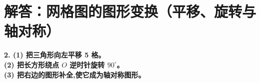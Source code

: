 

\section{解答：网格图的图形变换（平移、旋转与轴对称）}

\vspace{0.4cm}

\noindent\textbf{2. (1) 把三角形向左平移 5 格。}\\
\noindent\textbf{   (2) 把长方形绕点 $O$ 逆时针旋转 $90^{\circ}$。}\\
\noindent\textbf{   (3) 把右边的图形补全,使它成为轴对称图形。}

\vspace{1.2cm}


